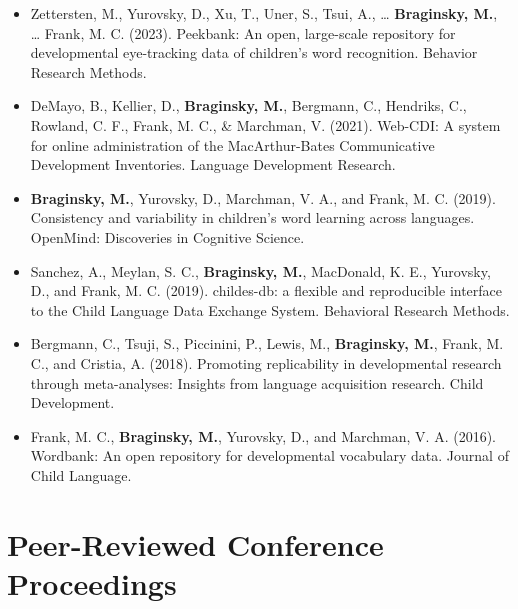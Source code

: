 \documentclass[11pt,]{article}
\begin{document}
\begin{itemize}
\item
  Zettersten, M., Yurovsky, D., Xu, T., Uner, S., Tsui, A., \ldots{}
  \textbf{Braginsky, M.}, \ldots{} Frank, M. C. (2023). Peekbank: An
  open, large-scale repository for developmental eye-tracking data of
  children's word recognition. Behavior Research Methods.
\item
  DeMayo, B., Kellier, D., \textbf{Braginsky, M.}, Bergmann, C.,
  Hendriks, C., Rowland, C. F., Frank, M. C., \& Marchman, V. (2021).
  Web-CDI: A system for online administration of the MacArthur-Bates
  Communicative Development Inventories. Language Development Research.
\item
  \textbf{Braginsky, M.}, Yurovsky, D., Marchman, V. A., and Frank, M.
  C. (2019). Consistency and variability in children's word learning
  across languages. OpenMind: Discoveries in Cognitive Science.
\item
  Sanchez, A., Meylan, S. C., \textbf{Braginsky, M.}, MacDonald, K. E.,
  Yurovsky, D., and Frank, M. C. (2019). childes-db: a flexible and
  reproducible interface to the Child Language Data Exchange System.
  Behavioral Research Methods.
\item
  Bergmann, C., Tsuji, S., Piccinini, P., Lewis, M., \textbf{Braginsky,
  M.}, Frank, M. C., and Cristia, A. (2018). Promoting replicability in
  developmental research through meta-analyses: Insights from language
  acquisition research. Child Development.
\item
  Frank, M. C., \textbf{Braginsky, M.}, Yurovsky, D., and Marchman, V.
  A. (2016). Wordbank: An open repository for developmental vocabulary
  data. Journal of Child Language.
\end{itemize}

\section{Peer-Reviewed Conference
Proceedings}\label{peer-reviewed-conference-proceedings}
\end{document}
